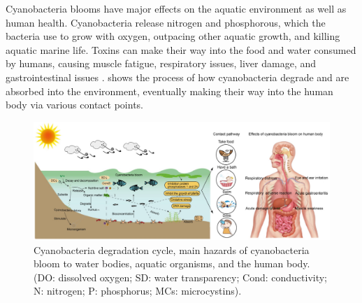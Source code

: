 Cyanobacteria blooms have major effects on the aquatic environment as well as human health. Cyanobacteria release nitrogen and phosphorous, which the bacteria use to grow with oxygen, outpacing other aquatic growth, and killing aquatic marine life. Toxins can make their way into the food and water consumed by humans, causing muscle fatigue, respiratory issues, liver damage, and gastrointestinal issues \cite{zhangImpactCyanobacteriaBlooms2022}.  shows the process of how cyanobacteria degrade and are absorbed into the environment, eventually making their way into the human body via various contact points. 
\begin{figure}
    \centering
    \includegraphics[width=0.75\linewidth]{Figures/cyanobacteria_bloom_cycle.png}
    \caption{Cyanobacteria degradation cycle, main hazards of cyanobacteria bloom to water bodies, aquatic organisms, and the human body. (DO: dissolved oxygen; SD: water transparency; Cond: conductivity; N: nitrogen; P: phosphorus; MCs: microcystins). \cite{zhangImpactCyanobacteriaBlooms2022}}
    \label{fig:cyanobacteria_bloom_cycle}
\end{figure}
